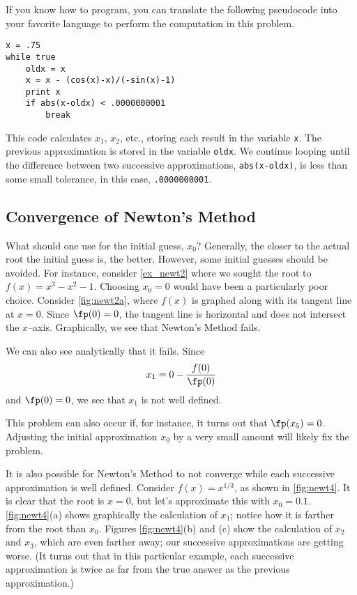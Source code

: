 If you know how to program, you can translate the following pseudocode into your favorite language to perform the computation in this problem.
\begin{center}
\begin{verbatim}
x = .75
while true
    oldx = x
    x = x - (cos(x)-x)/(-sin(x)-1)
    print x
    if abs(x-oldx) < .0000000001
        break
\end{verbatim}
\end{center}

This code calculates $x_1$, $x_2$, etc., storing each result in the variable \texttt{x}.  The previous approximation is stored in the variable \texttt{oldx}.  We continue looping until the difference between two successive approximations, \texttt{abs(x-oldx)}, is less than some small tolerance, in this case,
\texttt{.0000000001}.

\subsection*{Convergence of Newton's Method}

What should one use for the initial guess, $x_0$?  Generally, the closer to the actual root the initial guess is, the better.  However, some initial guesses should be avoided.  For instance, consider \autoref{ex_newt2} where we sought the root to $f(x) = x^3-x^2-1$.  Choosing  $x_0=0$ would have been a particularly poor choice. Consider \autoref{fig:newt2a}, where $f(x)$ is graphed along with its tangent line at $x=0$. Since $\fp(0)=0$, the tangent line is horizontal and does not intersect the $x$--axis. Graphically, we see that Newton's Method fails.


We can also see analytically that it fails. Since $$x_1 = 0 -\frac{f(0)}{\fp(0)}$$ and $\fp(0)=0$, we see that $x_1$ is not well defined.  

This problem can also occur if, for instance, it turns out that $\fp(x_5)=0$. Adjusting the initial approximation $x_0$ by a very small amount will likely fix the problem.

It is also possible for Newton's Method to not converge while each successive approximation is well defined. Consider $f(x) = x^{1/3}$, as shown in \autoref{fig:newt4}. It is clear that the root is $x=0$, but let's approximate this with $x_0=0.1$. \autoref{fig:newt4}(a) shows graphically the calculation of $x_1$; notice how it is farther from the root than $x_0$. Figures \ref{fig:newt4}(b) and (c) show the calculation of $x_2$ and $x_3$, which are even farther away; our successive approximations are getting worse. (It turns out that in this particular example, each successive approximation is twice as far from the true answer as the previous approximation.)

